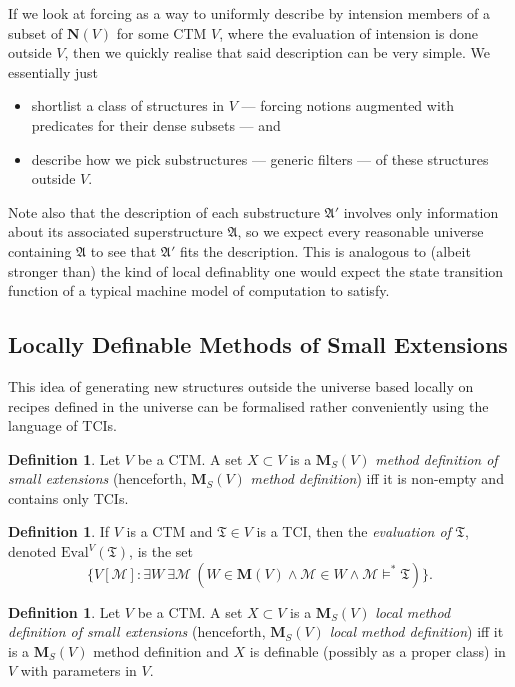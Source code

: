 \documentclass[12pt, twoside]{memoir}
\numberwithin{equation}{section}
\theoremstyle{definition}
\newtheorem{defi}[thm]{Definition}
\theoremstyle{remark}
\theoremstyle{definition}
\theoremstyle{definition}
\theoremstyle{definition}
\theoremstyle{remark}
\begin{document}
If we look at forcing as a way to uniformly describe by intension members of a subset of $\mathbf{N}(V)$ for some CTM $V$, where the evaluation of intension is done outside $V$, then we quickly realise that said description can be very simple. We essentially just 
\begin{itemize}
    \item shortlist a class of structures in $V$ --- forcing notions augmented with predicates for their dense subsets --- and
    \item describe how we pick substructures --- generic filters --- of these structures outside $V$. 
\end{itemize} 
Note also that the description of each substructure $\mathfrak{A}'$ involves only information about its associated superstructure $\mathfrak{A}$, so we expect every reasonable universe containing $\mathfrak{A}$ to see that $\mathfrak{A}'$ fits the description. This is analogous to (albeit stronger than) the kind of local definablity one would expect the state transition function of a typical machine model of computation to satisfy.

\subsection{Locally Definable Methods of Small Extensions}

This idea of generating new structures outside the universe based locally on recipes defined in the universe can be formalised rather conveniently using the language of TCIs. 

\begin{defi}\label{def320}
Let $V$ be a CTM. A set $X \subset V$ is a $\mathbf{M}_S(V)$ \emph{method definition of small extensions} (henceforth, $\mathbf{M}_S(V)$ \emph{method definition}) iff it is non-empty and contains only TCIs.
\end{defi}

\begin{defi}\label{def323}
If $V$ is a CTM and $\mathfrak{T} \in V$ is a TCI, then the \emph{evaluation of} $\mathfrak{T}$, denoted $\mathrm{Eval}^V(\mathfrak{T})$, is the set
\begin{equation*}
    \{V[\mathcal{M}] : \exists W \ \exists \mathcal{M} \ (W \in \mathbf{M}(V) \wedge \mathcal{M} \in W \wedge \mathcal{M} \models^* \mathfrak{T})\} \text{.}
\end{equation*}
\end{defi}

\begin{defi}\label{def923}
Let $V$ be a CTM. A set $X \subset V$ is a $\mathbf{M}_S(V)$ \emph{local method definition of small extensions} (henceforth, $\mathbf{M}_S(V)$ \emph{local method definition}) iff it is a $\mathbf{M}_S(V)$ method definition and $X$ is definable (possibly as a proper class) in $V$ with parameters in $V$. 
\end{defi}
\end{document}
